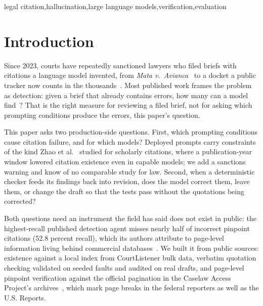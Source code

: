 \documentclass{IOS-Book-Article}
\begin{document}
\begin{frontmatter}
\begin{keyword}
legal citation\sep hallucination\sep large language models\sep verification\sep evaluation
\end{keyword}
\end{frontmatter}

\section{Introduction}\label{sec:intro}

Since 2023, courts have repeatedly sanctioned lawyers who filed briefs with citations a language model invented, from \textit{Mata v.~Avianca}~\cite{mata2023} to a docket a public tracker now counts in the thousands~\cite{charlotin2025tracker}. Most published work frames the problem as detection: given a brief that already contains errors, how many can a model find~\cite{liu2026whochecks,chen2026legalcitebench}? That is the right measure for reviewing a filed brief, not for asking which prompting conditions produce the errors, this paper's question.

This paper asks two production-side questions. First, which prompting conditions cause citation failure, and for which models? Deployed prompts carry constraints of the kind Zhao et al.~\cite{zhao2026deployment} studied for scholarly citations, where a publication-year window lowered citation existence even in capable models; we add a sanctions warning and know of no comparable study for law. Second, when a deterministic checker feeds its findings back into revision, does the model correct them, leave them, or change the draft so that the tests pass without the quotations being corrected?

Both questions need an instrument the field has said does not exist in public: the highest-recall published detection agent misses nearly half of incorrect pinpoint citations (52.8 percent recall), which its authors attribute to page-level information living behind commercial databases~\cite{liu2026whochecks}. We built it from public sources: existence against a local index from CourtListener bulk data, verbatim quotation checking validated on seeded faults and audited on real drafts, and page-level pinpoint verification against the official pagination in the Caselaw Access Project's archives~\cite{cap2024}, which mark page breaks in the federal reporters as well as the U.S. Reports.
\end{document}
